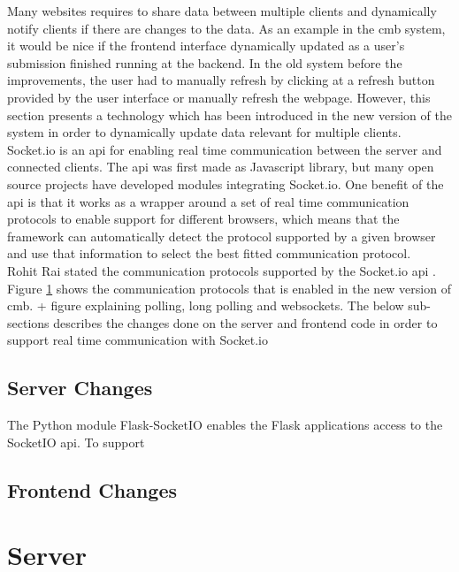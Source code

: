 Many websites requires to share data between multiple clients and dynamically notify clients if there are changes to the data. As an example in the \gls{cmb} system, it would be nice if the frontend interface dynamically updated as a user's submission finished running at the backend. In the old system before the improvements, the user had to manually refresh by clicking at a refresh button provided by the user interface or manually refresh the webpage. However, this section presents a technology which has been introduced in the new version of the system in order to dynamically update data relevant for multiple clients. \\

Socket.io \cite{SOCKETIO} is an \gls{api} for enabling real time communication between the server and connected clients. The \gls{api} was first made as Javascript library, but many open source projects have developed modules integrating Socket.io. One benefit of the \gls{api} is that it works as a wrapper around a set of real time communication protocols to enable support for different browsers, which means that the framework can automatically detect the protocol supported by a given browser and use that information to select the best fitted communication protocol. \\

Rohit Rai stated the communication protocols supported by the Socket.io \gls{api} \cite{Rai2013}. Figure \ref{} shows the communication protocols that is enabled in the new version of \gls{cmb}. + figure explaining polling, long polling and websockets. The below sub-sections describes the changes done on the server and frontend code in order to support real time communication with Socket.io\\

\subsection{Server Changes}
The Python module Flask-SocketIO enables the Flask applications access to the SocketIO \gls{api}. To support

\subsection{Frontend Changes}

\section{Server}

